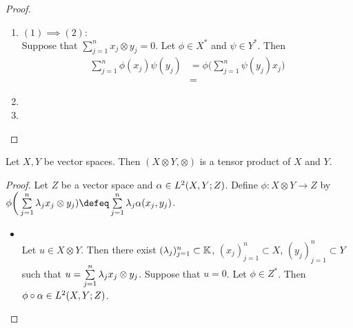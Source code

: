 \documentclass{book}
\begin{document}
	\begin{proof}\
		\begin{enumerate}
			\item $(1) \implies (2):$ \\
			Suppose that $\sum\limits_{j=1}^n x_j \otimes y_j = 0$. Let $\phi \in X^*$ and $\psi \in Y^*$. Then 
			\begin{align*}
				\sum\limits_{j=1}^n  \phi(x_j) \psi(y_j)
				& = \phi \bigg( \sum\limits_{j=1}^n \psi(y_j) x_j \bigg) \\
				& = 
			\end{align*}
			\item 
			\item 
		\end{enumerate}
	\end{proof}

	\begin{ex}
		Let $X, Y$ be vector spaces. Then $(X \otimes Y, \otimes)$ is a tensor product of $X$ and $Y$. 
	\end{ex}

	\begin{proof}
		Let $Z$ be a vector space and $\alpha \in L^2(X, Y; Z)$. Define $\phi: X \otimes Y \rightarrow Z$ by $\phi \bigg( \sum\limits_{j=1}^n \lam_j x_j \otimes y_j) \defeq \sum\limits_{j =1}^n \lam_j \al(x_j, y_j)$.  
		\begin{itemize}
			\item {} \\
			Let $u \in X \otimes Y$. Then there exist $(\lambda_j)_{j=1}^n \subset \mathbb{K}$, $(x_j)_{j=1}^n \subset X$, $(y_j)_{j=1}^n \subset Y$ such that $u = \sum\limits_{j=1}^n \lambda_j x_j \otimes y_j$. Suppose that $u = 0$. Let $\phi \in Z^*$. Then $\phi \circ \alpha \in L^2(X,Y; Z)$.  
		\end{itemize}
	\end{proof}

	
	
	
	
	
	
	
	
	
	
	
	
	
	
	
	
	
	
	
	
	
	
	
	
	
	
	
	
	
	
\end{document}
